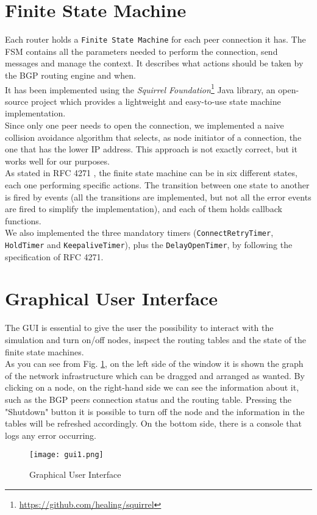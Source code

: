 \section{Finite State Machine}\label{fsm}
Each router holds a \texttt{Finite State Machine} for each peer connection it has. The FSM contains all the parameters needed to perform the connection, send messages and manage the context. It describes what actions should be taken by the BGP routing engine and when.\\
It has been implemented using the \textit{Squirrel Foundation}\footnote{\url{https://github.com/healing/squirrel}} Java library, an open-source project which provides a lightweight and easy-to-use state machine implementation.\\
Since only one peer needs to open the connection, we implemented a naive collision avoidance algorithm that selects, as node initiator of a connection, the one that has the lower IP address. This approach is not exactly correct, but it works well for our purposes.\\
As stated in RFC 4271 \cite{rfc4271}, the finite state machine can be in six different states, each one performing specific actions. The transition between one state to another is fired by events (all the transitions are implemented, but not all the error events are fired to simplify the implementation), and each of them holds callback functions.\\
We also implemented the three mandatory timers (\texttt{ConnectRetryTimer}, \texttt{HoldTimer} and \texttt{KeepaliveTimer}), plus the \texttt{DelayOpenTimer}, by following the specification of RFC 4271.

\section{Graphical User Interface}
The GUI is essential to give the user the possibility to interact with the simulation and turn on/off nodes, inspect the routing tables and the state of the finite state machines.\\
As you can see from Fig. \ref{fig:gui}, on the left side of the window it is shown the graph of the network infrastructure which can be dragged and arranged as wanted. By clicking on a node, on the right-hand side we can see the information about it, such as the BGP peers connection status and the routing table. Pressing the "Shutdown" button it is possible to turn off the node and the information in the tables will be refreshed accordingly.
On the bottom side, there is a console that logs any error occurring.
\begin{figure}[h]
    \centering
    \texttt{[image: gui1.png]}
    \caption{Graphical User Interface}
    \label{fig:gui}
\end{figure}


